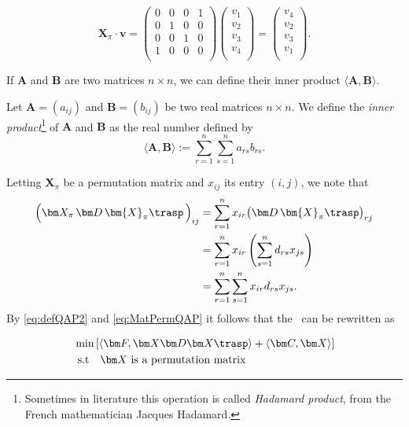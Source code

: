 \[
\bm X_\pi \cdot \bm v =
 \begin{pmatrix}
	0 & 0 & 0 & 1 \\
	0 & 1 & 0 & 0 \\
	0 & 0 & 1 & 0 \\
	1 & 0 & 0 & 0 \\
\end{pmatrix} 
\begin{pmatrix}
v_1\\
v_2\\
v_3\\
v_4\\	
\end{pmatrix}
= \begin{pmatrix}
	v_4\\
	v_2\\
	v_3\\
	v_1\\	
\end{pmatrix}.
\]


\noindent If $\bm A$ and $\bm B$ are two matrices $n \times n$, we can define their inner product $ \langle \bm A, \bm B \rangle $.


\begin{defi}
	Let $\bm A= (a_{ij})$ and $\bm B=(b_{ij})$ be two real matrices $n \times n$. We define the \textit{inner product}\footnote{Sometimes in literature this operation is called \textit{Hadamard product}, from the French mathematician Jacques Hadamard.} of $\bm A$ and $\bm B$ as the real number defined by
\[
\langle \bm A,\bm B \rangle 
:= \sum_{r=1}^n \sum_{s=1}^n a_{rs}b_{rs}.
\]
\end{defi}

\noindent Letting $\bm X_\pi$ be a permutation matrix and $x_{ij}$ its entry $(i,j)$, we note that 
\begin{equation}
	\label{eq:MatPermQAP}
	\begin{split}
\Bigl(\bm X_\pi \,   \bm D \, \bm {X}_\pi \trasp \, \Bigr)_{ij} 
&=\sum_{r=1}^n x_{ir} \big( \bm D \, \bm {X}_\pi \trasp \big)_{rj}   \\
&=\sum_{r=1}^n x_{ir} \left(\sum_{s=1}^n d_{rs}x_{js}\right)   \\
&=\sum_{r=1}^n \sum_{s=1}^n x_{ir}  d_{rs}x_{js}.
\end{split}
\end{equation}
By \eqref{eq:defQAP2} and \eqref{eq:MatPermQAP} it follows that the \QAP \ can be rewritten as 

\begin{tcolorbox}[title=Inner product formulation]
\begin{equation}
\label{eq:defQAP3}
\begin{split}	
&\min{\left[\langle \bm F, \bm X \bm D \bm X\trasp \rangle +  \langle \bm C, \bm X \rangle \right]} \\
&\text{ s.t} \quad \bm X \text{ is a permutation matrix} \\
\end{split}
\end{equation}
\end{tcolorbox}


